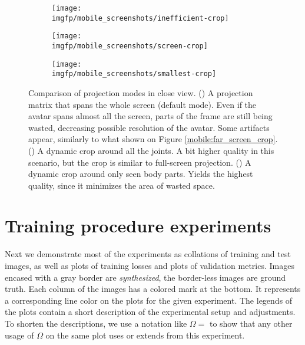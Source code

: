 \begin{figure}
	\centering
	\begin{subfigure}[b]{0.32\textwidth}
		\centering
		\texttt{[image: \\imgfp/mobile\_screenshots/inefficient-crop]}%
		\caption{}
		\label{fig:zoom_inefficient_crop}
	\end{subfigure}
	\hfill
	\begin{subfigure}[b]{0.32\textwidth}
		\centering
		\texttt{[image: \\imgfp/mobile\_screenshots/screen-crop]}
		\caption{}
		\label{fig:zoom_screen_crop}
	\end{subfigure}
	\hfill
	\begin{subfigure}[b]{0.32\textwidth}
		\centering
		\texttt{[image: \\imgfp/mobile\_screenshots/smallest-crop]}
		\caption{}
		\label{fig:zoom_smallest_crop}
	\end{subfigure}
	\caption{Comparison of projection modes in close view. (\protect{}) A projection matrix that spans the whole screen (default mode). Even if the avatar spans almost all the screen, parts of the frame are still being wasted, decreasing possible resolution of the avatar. Some artifacts appear, similarly to what shown on Figure \ref{mobile:far_screen_crop}. (\protect{}) A dynamic crop around all the joints. A bit higher quality in this scenario, but the crop is similar to full-screen projection. (\protect{}) A dynamic crop around only seen body parts. Yields the highest quality, since it minimizes the area of wasted space.}
\end{figure}
\clearpage
\newpage

\section{Training procedure experiments}
\label{appb:exps}
Next we demonstrate most of the experiments as collations of training and test images, as well as plots of training losses and plots of validation metrics. Images encased with a gray border are \textit{synthesized}, the border-less images are ground truth. Each column of the images has a colored mark at the bottom. It represents a corresponding line color on the plots for the given experiment. The legends of the plots contain a short description of the experimental setup and adjustments. To shorten the descriptions, we use a notation like $\Omega=$ to show that any other usage of $\Omega$ on the same plot uses or extends from this experiment. 

